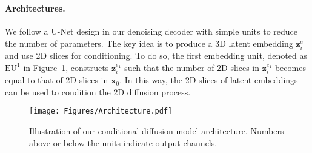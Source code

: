 \section*{\appendixname}

\paragraph{\textbf{Architectures.}}
We follow a U-Net design in our denoising decoder with simple units to reduce the number of parameters. The key idea is to produce a 3D latent embedding $\boldsymbol{z}_i^e$ and use 2D slices for conditioning. To do so, the first embedding unit, denoted as $\textrm{EU}^1$ in Figure~\ref{fig:cd_archit}, constructs $\boldsymbol{z}_{i}^{e_1}$ such that the number of 2D slices in $\boldsymbol{z}_{i}^{e_1}$ becomes equal to that of  2D slices in $\boldsymbol{x}_0$. In this way, the 2D slices of latent embeddings can be used to condition the 2D diffusion process.

\begin{figure}[ht]
    \vspace{-0.4cm}
    \centering
    \texttt{[image: Figures/Architecture.pdf]}
    \caption{Illustration of our conditional diffusion model architecture. Numbers above or below the units indicate output channels.}\label{fig:cd_archit}
    \vspace{-0.8cm}
\end{figure}